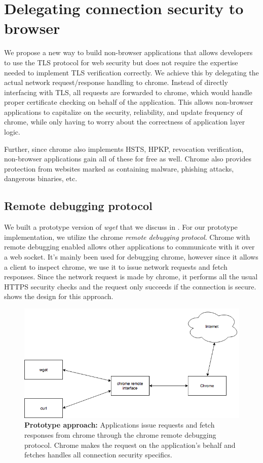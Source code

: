 \section{Delegating connection security to browser}
\label{sec:solution-saber}

We propose a new way to build non-browser applications that allows developers
to use the TLS protocol for web security but does not require the expertise
needed to implement TLS verification correctly. We achieve this by delegating
the actual network request/response handling to chrome. Instead of directly
interfacing with TLS, all requests are forwarded to chrome, which would handle
proper certificate checking on behalf of the application. This allows non-browser
applications to capitalize on the security, reliability, and update frequency of
chrome, while only having to worry about the correctness of application layer
logic.

Further, since chrome also implements HSTS, HPKP, revocation verification, non-browser
applications gain all of these for free as well. Chrome also provides protection
from websites marked as containing malware, phishing attacks, dangerous binaries, etc.

\subsection{Remote debugging protocol}
We built a prototype version of \emph{wget} that we discuss in
. For our prototype implementation, we utilize the chrome
\emph{remote debugging protocol}. Chrome with remote debugging enabled allows
other applications to communicate with it over a web socket. It's mainly been
used for debugging chrome, however since it allows a client to inspect chrome,
we use it to issue network requests and fetch responses. Since the network
request is made by chrome, it performs all the usual HTTPS security checks and
the request only succeeds if the connection is secure. 
shows the design for this approach.

\begin{figure}[h]
  \includegraphics[width=\textwidth]{figures/prototype}
  \caption[Prototype approach]{\textbf{Prototype approach:} Applications issue
  requests and fetch responses from chrome through the chrome remote debugging
  protocol. Chrome makes the request on the application's behalf and fetches
  handles all connection security specifics.}
  \label{fig:prototype-saber}
\end{figure}

